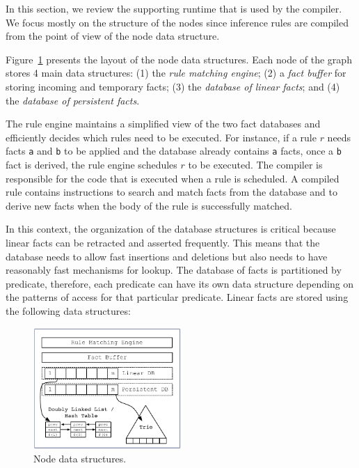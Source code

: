 In this section, we review the supporting runtime that is used by the compiler.
We focus mostly on the structure of the nodes since inference rules are compiled
from the point of view of the node data structure.

Figure~\ref{fig:node} presents the layout of the node data structures.  Each
node of the graph stores 4 main data structures: (1) the \emph{rule matching
   engine}; (2) a \emph{fact buffer} for storing incoming and temporary facts;
(3) the \emph{database of linear facts}; and (4) the \emph{database of
   persistent facts}.

The rule engine maintains a simplified view of the two fact databases and
efficiently decides which rules need to be executed. For instance, if a rule $r$
needs facts \texttt{a} and \texttt{b} to be applied and the database already
contains \texttt{a} facts, once a \texttt{b} fact is derived, the rule engine
schedules $r$ to be executed. The compiler is responsible for the code that is
executed when a rule is scheduled.  A compiled rule contains instructions to
search and match facts from the database and to derive new facts when the body
of the rule is successfully matched.

In this context, the organization of the database structures is critical because
linear facts can be retracted and asserted frequently. This means that the
database needs to allow fast insertions and deletions but also needs to have
reasonably fast mechanisms for lookup. The database of facts is partitioned by
predicate, therefore, each predicate can have its own data structure depending
on the patterns of access for that particular predicate. Linear facts are stored
using the following data structures:

\begin{figure}
\vspace{-1cm}
\begin{center}
   \includegraphics[width=0.5\textwidth]{figures/overview.pdf}
\end{center}
\caption{Node data structures.}
\label{fig:node}
\vspace{-2cm}
\end{figure}


